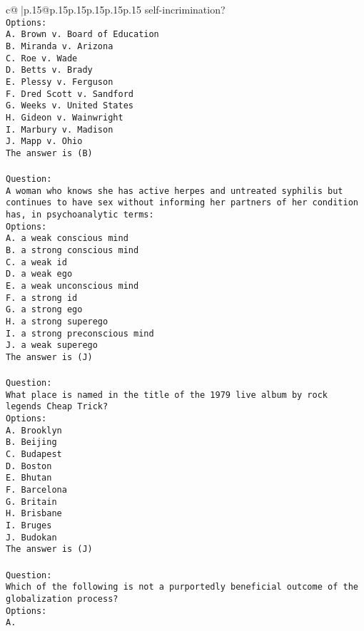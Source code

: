 \documentclass{article}
\begin{document}
{\begin{supertabular}{c@{$\;$}|p{.15\linewidth}@{}p{.15\linewidth}p{.15\linewidth}p{.15\linewidth}p{.15\linewidth}p{.15\linewidth}}
{{{self-incrimination?\\ \tt Options:\\ \tt A. Brown v. Board of Education\\ \tt B. Miranda v. Arizona\\ \tt C. Roe v. Wade\\ \tt D. Betts v. Brady\\ \tt E. Plessy v. Ferguson\\ \tt F. Dred Scott v. Sandford\\ \tt G. Weeks v. United States\\ \tt H. Gideon v. Wainwright\\ \tt I. Marbury v. Madison\\ \tt J. Mapp v. Ohio\\ \tt The answer is (B)\\ \tt \\ \tt Question:\\ \tt A woman who knows she has active herpes and untreated syphilis but continues to have sex without informing her partners of her condition has, in psychoanalytic terms:\\ \tt Options:\\ \tt A. a weak conscious mind\\ \tt B. a strong conscious mind\\ \tt C. a weak id\\ \tt D. a weak ego\\ \tt E. a weak unconscious mind\\ \tt F. a strong id\\ \tt G. a strong ego\\ \tt H. a strong superego\\ \tt I. a strong preconscious mind\\ \tt J. a weak superego\\ \tt The answer is (J)\\ \tt \\ \tt Question:\\ \tt What place is named in the title of the 1979 live album by rock legends Cheap Trick?\\ \tt Options:\\ \tt A. Brooklyn\\ \tt B. Beijing\\ \tt C. Budapest\\ \tt D. Boston\\ \tt E. Bhutan\\ \tt F. Barcelona\\ \tt G. Britain\\ \tt H. Brisbane\\ \tt I. Bruges\\ \tt J. Budokan\\ \tt The answer is (J)\\ \tt \\ \tt Question:\\ \tt Which of the following is not a purportedly beneficial outcome of the globalization process?\\ \tt Options:\\ \tt A. }}}
\end{supertabular}}
\end{document}
